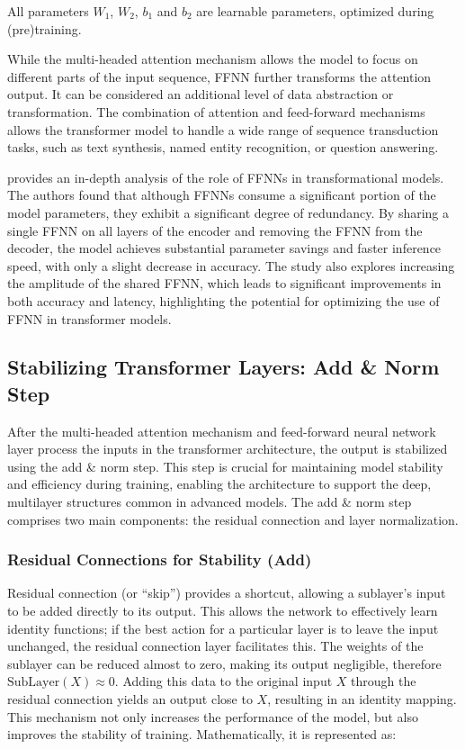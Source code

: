 All parameters \( W_1 \), \( W_2 \), \( b_1 \) and \( b_2 \) are learnable parameters, optimized during (pre)training.

While the multi-headed attention mechanism allows the model to focus on different parts of the input sequence, FFNN further transforms the attention output. It can be considered an additional level of data abstraction or transformation. The combination of attention and feed-forward mechanisms allows the transformer model to handle a wide range of sequence transduction tasks, such as text synthesis, named entity recognition, or question answering.

\cite{pires2023one} provides an in-depth analysis of the role of FFNNs in transformational models. The authors found that although FFNNs consume a significant portion of the model parameters, they exhibit a significant degree of redundancy. By sharing a single FFNN on all layers of the encoder and removing the FFNN from the decoder, the model achieves substantial parameter savings and faster inference speed, with only a slight decrease in accuracy. The study also explores increasing the amplitude of the shared FFNN, which leads to significant improvements in both accuracy and latency, highlighting the potential for optimizing the use of FFNN in transformer models.

\subsection{Stabilizing Transformer Layers: Add \& Norm Step}

After the multi-headed attention mechanism and feed-forward neural network layer process the inputs in the transformer architecture, the output is stabilized using the add \& norm step. This step is crucial for maintaining model stability and efficiency during training, enabling the architecture to support the deep, multilayer structures common in advanced models. The add \& norm step comprises two main components: the residual connection and layer normalization.

\subsubsection{Residual Connections for Stability (Add)}

Residual connection (or “skip”) provides a shortcut, allowing a sublayer's input to be added directly to its output. This allows the network to effectively learn identity functions; if the best action for a particular layer is to leave the input unchanged, the residual connection layer facilitates this. The weights of the sublayer can be reduced almost to zero, making its output negligible, therefore \(\text{SubLayer}(X) \approx 0\). Adding this data to the original input \(X\) through the residual connection yields an output close to \(X\), resulting in an identity mapping. This mechanism not only increases the performance of the model, but also improves the stability of training. Mathematically, it is represented as:


